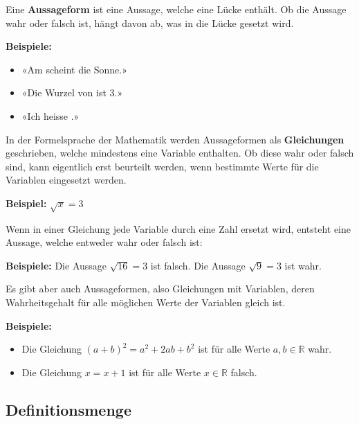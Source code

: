 Eine \textbf{Aussageform} ist eine Aussage, welche eine Lücke enthält. Ob die Aussage wahr oder falsch ist, hängt davon ab, was in die Lücke gesetzt wird.
\begin{example}
  \textbf{Beispiele:}
  \begin{itemize}[noitemsep]
    \item «Am \underline{\hspace{1cm}} scheint die Sonne.»
    \item «Die Wurzel von \underline{\hspace{1cm}} ist 3.»
    \item «Ich heisse \underline{\hspace{1cm}}.»
  \end{itemize}
\end{example}
In der Formelsprache der Mathematik werden Aussageformen als \textbf{Gleichungen} geschrieben, welche mindestens eine Variable enthalten. Ob diese wahr oder falsch sind, kann eigentlich erst beurteilt werden, wenn bestimmte Werte für die Variablen eingesetzt werden.
\begin{example}
  \textbf{Beispiel:} $\sqrt{x} = 3$
\end{example}
Wenn in einer Gleichung jede Variable durch eine Zahl ersetzt wird, entsteht eine Aussage, welche entweder wahr oder falsch ist:
\begin{example}
  \textbf{Beispiele:} Die Aussage $\sqrt{16} = 3$ ist falsch. Die Aussage $\sqrt{9} = 3$ ist wahr.
\end{example}
Es gibt aber auch Aussageformen, also Gleichungen mit Variablen, deren Wahrheitsgehalt für alle möglichen Werte der Variablen gleich ist.
\begin{example}
  \textbf{Beispiele:}
  \begin{itemize}[noitemsep]
    \item Die Gleichung $(a+b)^2= a^2+2ab+b^2$ ist für alle Werte $a,b\in\mathbb{R}$ wahr.
    \item Die Gleichung $x=x+1$ ist für alle Werte $x\in\mathbb{R}$ falsch.
  \end{itemize}
\end{example}

\subsection{Definitionsmenge}

